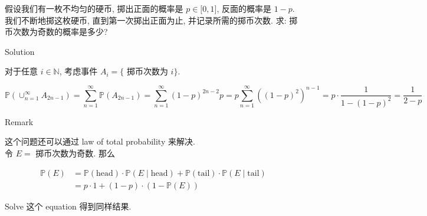\begin{example}

假设我们有一枚不均匀的硬币, 掷出正面的概率是 \(\mathit{p} \in \lbrack 0,1\rbrack\), 反面的概率是 \(1 - \mathit{p}\). 我们不断地掷这枚硬币, 直到第一次掷出正面为止, 并记录所需的掷币次数. 求: 掷币次数为奇数的概率是多少?

\begin{qlsolution}{Solution}

对于任意 \(\mathit{i} \in \mathbb{N}\), 考虑事件 \(\mathit{A}_{\mathit{i}} = \{\) 掷币次数为 \(\mathit{i}\}\).

\[\mathbb{P}\left( {\cup_{\mathit{n} = 1}^{\infty}\mathit{A}_{2\mathit{n} - 1}} \right) = \sum\limits_{\mathit{n} = 1}^{\infty}\mathbb{P}\left( \mathit{A}_{2\mathit{n} - 1} \right) = \sum\limits_{\mathit{n} = 1}^{\infty}(1 - \mathit{p})^{2\mathit{n} - 2}\mathit{p} = \mathit{p}\sum\limits_{\mathit{n} = 1}^{\infty}\left( {(1 - \mathit{p})^{2}} \right)^{\mathit{n} - 1} = \mathit{p} \cdot \frac{1}{1 - (1 - \mathit{p})^{2}} = \frac{1}{2 - \mathit{p}}\]

\end{qlsolution}

\begin{qlremark}{Remark}

这个问题还可以通过 law of total probability 来解决.\\
令 \(\mathit{E} =\) 掷币次数为奇数. 那么

\[\begin{matrix}
{\mathbb{P}(\mathit{E})} & {= \mathbb{P}(\text{head}) \cdot \mathbb{P}(\mathit{E} \mid \text{head}) + \mathbb{P}(\text{tail}) \cdot \mathbb{P}(\mathit{E} \mid \text{tail})} \\
 & {= \mathit{p} \cdot 1 + (1 - \mathit{p}) \cdot (1 - \mathbb{P}(\mathit{E}))}
\end{matrix}\]

Solve 这个 equation 得到同样结果.

\end{qlremark}

\end{example}
